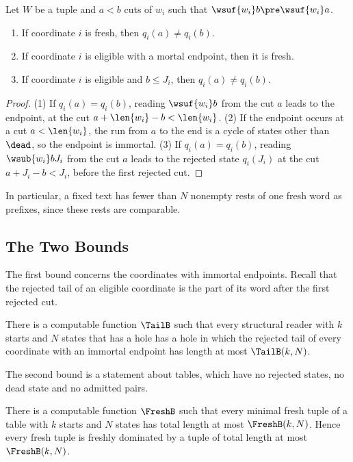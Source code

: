 \begin{lemma}\label{lem:distinct}
Let $W$ be a tuple and $a<b$ cuts of $w_i$ such that
$\wsuf{w_i}b\pre\wsuf{w_i}a$.
\begin{enumerate}
\item\label{it:distinct-fresh} If coordinate $i$ is fresh, then
  $q_i(a)\ne q_i(b)$.
\item\label{it:distinct-mortal} If coordinate $i$ is eligible with a mortal
  endpoint, then it is fresh.
\item\label{it:distinct-head} If coordinate $i$ is eligible and
  $b\le J_i$, then $q_i(a)\ne q_i(b)$.
\end{enumerate}
\end{lemma}

\begin{proof}
(1) If $q_i(a)=q_i(b)$, reading $\wsuf{w_i}b$ from the cut $a$ leads to the
endpoint, at the cut $a+\len{w_i}-b<\len{w_i}$. (2) If the endpoint occurs at
a cut $a<\len{w_i}$, the run from $a$ to the end is a cycle of states other
than $\dead$, so the endpoint is immortal. (3) If $q_i(a)=q_i(b)$, reading
$\wsub{w_i}b{J_i}$ from the cut $a$ leads to the rejected state $q_i(J_i)$ at
the cut $a+J_i-b<J_i$, before the first rejected cut.
\end{proof}

In particular, a fixed text has fewer than $N$ nonempty rests of one fresh
word as prefixes, since these rests are comparable.

\subsection{The Two Bounds}\label{sec:overview-bounds}

The first bound concerns the coordinates with immortal endpoints. Recall that
the rejected tail of an eligible coordinate is the part of its word after
the first rejected cut.

\begin{theorem}\label{thm:tails}
There is a computable function $\TailB$ such that every structural reader
with $k$ starts and $N$ states that has a hole has a hole in which the
rejected tail of every coordinate with an immortal endpoint has length at
most $\TailB(k,N)$.
\end{theorem}

The second bound is a statement about tables, which have no rejected states,
no dead state and no admitted pairs.

\begin{theorem}\label{thm:fresh}
There is a computable function $\FreshB$ such that every minimal fresh tuple
of a table with $k$ starts and $N$ states has total length at most
$\FreshB(k,N)$. Hence every fresh tuple is freshly dominated by a tuple of
total length at most $\FreshB(k,N)$.
\end{theorem}

